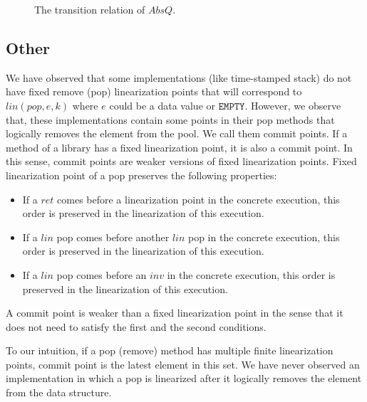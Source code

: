 \begin{figure} [t]
{\begin{mathpar}
    \hspace{5mm}

    
      \end{mathpar}
  }
 \vspace{-5mm}
  \caption{The transition relation of $AbsQ$.}
  \label{fig:transitions:AbsS}
\vspace{-6mm}
\end{figure}


\subsection{Other}



We have observed that some implementations (like time-stamped stack) do not have fixed remove (pop) linearization points that will correspond to $lin(pop,e,k)$ where $e$ could be a data value or $\texttt{EMPTY}$. However, we observe that, these implementations contain some points in their pop methods that logically removes the element from the pool. We call them commit points. If a method of a library has a fixed linearization  point, it is also a commit point. In this sense, commit points are weaker versions of fixed linearization points. Fixed linearization point of a pop preserves the following properties:
\begin{itemize}
\item If a $ret$ comes before a linearization point in the concrete execution, this order is preserved in the linearization of this execution.
\item If a $lin$ pop comes before another $lin$ pop in the concrete execution, this order is preserved in the linearization of this execution.
\item If a $lin$ pop comes before an $inv$ in the concrete execution, this order is preserved in the linearization of this execution. 
\end{itemize} 
A commit point is weaker than a fixed linearization point in the sense that it does not need to satisfy the first and the second conditions. 

To our intuition, if a pop (remove) method has multiple finite linearization points, commit point is the latest element in this set. We have never observed an implementation in which a pop is linearized after it logically removes the element from the data structure. 


